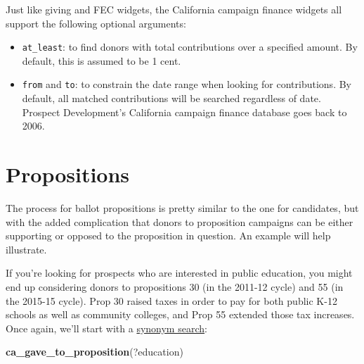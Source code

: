 \documentclass[]{book}
\newenvironment{Shaded}{\begin{snugshade}}{\end{snugshade}}
\newcommand{\KeywordTok}[1]{\textcolor[rgb]{0.13,0.29,0.53}{\textbf{#1}}}
\newcommand{\NormalTok}[1]{#1}
\providecommand{\tightlist}{%
  \setlength{\itemsep}{0pt}\setlength{\parskip}{0pt}}
\begin{document}
Just like giving and FEC widgets, the California campaign finance widgets all support the following optional arguments:

\begin{itemize}
\tightlist
\item
  \texttt{at\_least}: to find donors with total contributions over a specified amount. By default, this is assumed to be 1 cent.
\item
  \texttt{from} and \texttt{to}: to constrain the date range when looking for contributions. By default, all matched contributions will be searched regardless of date. Prospect Development's California campaign finance database goes back to 2006.
\end{itemize}

\hypertarget{propositions}{%
\section{Propositions}\label{propositions}}

The process for ballot propositions is pretty similar to the one for candidates, but with the added complication that donors to proposition campaigns can be either supporting or opposed to the proposition in question. An example will help illustrate.

If you're looking for prospects who are interested in public education, you might end up considering donors to propositions 30 (in the 2011-12 cycle) and 55 (in the 2015-15 cycle). Prop 30 raised taxes in order to pay for both public K-12 schools as well as community colleges, and Prop 55 extended those tax increases. Once again, we'll start with a \protect\hyperlink{synonym-search}{synonym search}:

\begin{Shaded}
\begin{Highlighting}[]
\KeywordTok{ca_gave_to_proposition}\NormalTok{(?education)}
\end{Highlighting}
\end{Shaded}
\end{document}
